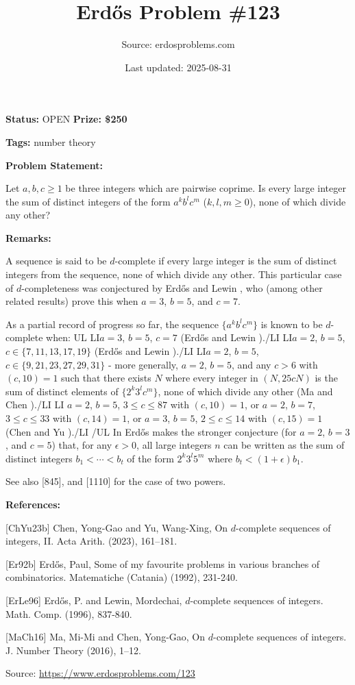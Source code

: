 \documentclass{article}
\title{Erd\H{o}s Problem \#123}
\date{Last updated: 2025-08-31}
\author{Source: erdosproblems.com}
\begin{document}
\maketitle

\noindent\textbf{Status:} OPEN \quad \textbf{Prize: \$250}

\noindent\textbf{Tags:} number theory

\medskip
\noindent\textbf{Problem Statement:}

Let $a,b,c\geq 1$ be three integers which are pairwise coprime. Is every large integer the sum of distinct integers of the form $a^kb^lc^m$ ($k,l,m\geq 0$), none of which divide any other?

\bigskip
\noindent\textbf{Remarks:}

A sequence is said to be $d$-complete if every large integer is the sum of distinct integers from the sequence, none of which divide any other. This particular case of $d$-completeness was conjectured by Erd\H{o}s and Lewin \cite{ErLe96}, who (among other related results) prove this when $a=3$, $b=5$, and $c=7$.

As a partial record of progress so far, the sequence $\{a^kb^lc^m\}$ is known to be $d$-complete when:
{UL}
{LI}$a=3$, $b=5$, $c=7$ (Erd\H{o}s and Lewin \cite{ErLe96}).{/LI}
{LI}$a=2$, $b=5$, $c\in \{7,11,13,17,19\}$ (Erd\H{o}s and Lewin \cite{ErLe96}).{/LI}
{LI}$a=2$, $b=5$, $c\in \{9,21,23,27,29,31\}$ - more generally, $a=2$, $b=5$, and any $c>6$ with $(c,10)=1$ such that there exists $N$ where every integer in $(N,25cN)$ is the sum of distinct elements of $\{2^k3^lc^m\}$, none of which divide any other (Ma and Chen \cite{MaCh16}).{/LI}
{LI} $a=2$, $b=5$, $3\leq c\leq 87$ with $(c,10)=1$, or $a=2$, $b=7$, $3\leq c\leq 33$ with $(c,14)=1$, or $a=3$, $b=5$, $2\leq c\leq 14$ with $(c,15)=1$ (Chen and Yu \cite{ChYu23b}).{/LI}
{/UL}
In \cite{Er92b} Erd\H{o}s makes the stronger conjecture (for $a=2$, $b=3$, and $c=5$) that, for any $\epsilon>0$, all large integers $n$ can be written as the sum of distinct integers $b_1<\cdots <b_t$ of the form $2^k3^l5^m$ where $b_t<(1+\epsilon)b_1$.

See also [845], and [1110] for the case of two powers.

\bigskip
\noindent\textbf{References:}

[ChYu23b] Chen, Yong-Gao and Yu, Wang-Xing, On {$d$}-complete sequences of integers, {II}. Acta Arith. (2023), 161--181.
 
 [Er92b] Erd\H{o}s, Paul, Some of my favourite problems in various branches of combinatorics. Matematiche (Catania) (1992), 231-240.
 
 [ErLe96] Erd\H{o}s, P. and Lewin, Mordechai, $d$-complete sequences of integers. Math. Comp. (1996), 837-840.
 
 [MaCh16] Ma, Mi-Mi and Chen, Yong-Gao, On {$d$}-complete sequences of integers. J. Number Theory (2016), 1--12.

\bigskip
\noindent\small{Source: \url{https://www.erdosproblems.com/123}}
\end{document}
